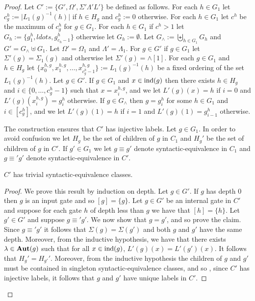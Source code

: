 \documentclass[../paper.tex]{subfiles}
\begin{document}
\begin{proof}
  Let $C' := \{G', \Omega', \Sigma' \Lambda' L'\}$ be defined as follows. For
  each $h \in G_1$ let $c^h_g := \vert L_1(g)^{-1}(h) \vert$ if $h \in H_g$ and
  $c^h_g := 0$ otherwise. For each $h \in G_1$ let $c^h$ be the maximum of
  $c^h_g$ for $g \in G_1$. For each $h \in G_1$ if $c^h > 1$ let $G_h :=
  \{g^{h}_{1}, ldots, g^h_{c_h-1}\}$ otherwise let $G_h := \emptyset$. Let
  $G_{\land} := \biguplus_{h \in G_1} G_h$ and $G' = G_{\land} \uplus G_1$. Let
  $\Omega' = \Omega_1$ and $\Lambda' = \Lambda_1$. For $g \in G'$ if $g \in G_1$
  let $\Sigma'(g) = \Sigma_1(g)$ and otherwise let $\Sigma'(g) = \land[1]$. For
  each $g \in G_1$ and $h \in H_g$ let $\{x^{h,g}_0, x^{h,g}_1 ,\ldots,
  x^{h,g}_{c^h_g - 1}\} := L_1(g)^{-1}(h)$ be a fixed ordering of the set
  $L_1(g)^{-1}(h)$. Let $g \in G'$. If $g \in G_1$ and $x \in \text{\upshape ind}(g)$ then
  there exists $h \in H_g$ and $i \in \{0, \ldots , c^h_g -1\}$ such that $x =
  x^{h,g}_i$, and we let $L'(g)(x) = h$ if $i = 0$ and $L'(g)(x^{h,g}_i) =
  g^h_i$ otherwise. If $g \in G_{\land}$ then $g = g^h_i$ for some $h \in G_1$
  and $i \in [c^h_g]$, and we let $L'(g)(1) = h$ if $i = 1$ and $L'(g)(1) =
  g^h_{i-1}$ otherwise.

  The construction ensures that $C'$ has injective labels. Let $g \in G_1$. In
  order to avoid confusion we let $H_g$ be the set of children of $g$ in $C_1$
  and $H_g'$ be the set of children of $g$ in $C'$. If $g' \in G_1$ we let $g
  \equiv g'$ denote syntactic-equivalence in $C_1$ and $g \equiv' g'$ denote
  syntactic-equivalence in $C'$.
  
  \begin{claim}
    $C'$ has trivial syntactic-equivalence classes.
  \end{claim}
  \begin{proof}
    We prove this result by induction on depth. Let $g \in G'$. If $g$ has depth
    $0$ then $g$ is an input gate and so $[g] = \{g\}$. Let $g \in G'$ be an
    internal gate in $C'$ and suppose for each gate $h$ of depth less than $g$
    we have that $[h] = \{ h \}$. Let $g' \in G'$ and suppose $g \equiv' g'$. We
    now show that $g = g'$, and so prove the claim. Since $g \equiv' g'$ it
    follows that $\Sigma (g) = \Sigma(g')$ and both $g$ and $g'$ have the same
    depth. Moreover, from the inductive hypothesis, we have that there exists
    $\lambda \in \text{\textbf{Aut}}(g)$ such that for all $x \in \text{\upshape ind}(g)$, $L'(g) (x) =
    L'(g')(x)$. It follows that $H_{g}' = H_{g'}'$. Moreover, from the inductive
    hypothesis the children of $g$ and $g'$ must be contained in singleton
    syntactic-equivalence classes, and so , since $C'$ has injective labels, it
    follows that $g$ and $g'$ have unique labels in $C'$.


\end{proof}
\end{proof}
\end{document}
